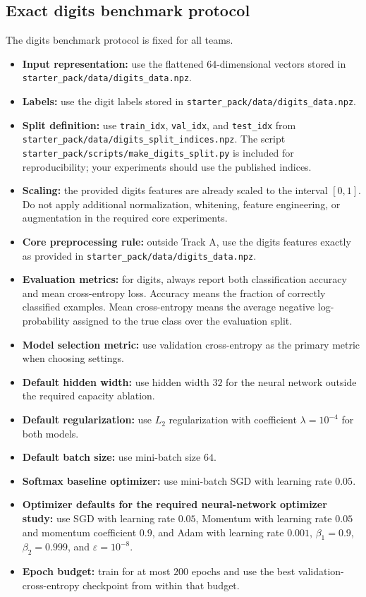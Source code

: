\documentclass[11pt]{article}
\newcommand{\filepath}[1]{\nolinkurl{#1}}
\begin{document}
\subsection{Exact digits benchmark protocol}

The digits benchmark protocol is fixed for all teams.

\begin{itemize}
    \item \textbf{Input representation:} use the flattened 64-dimensional vectors stored in \filepath{starter_pack/data/digits_data.npz}.
    \item \textbf{Labels:} use the digit labels stored in \filepath{starter_pack/data/digits_data.npz}.
    \item \textbf{Split definition:} use \texttt{train\_idx}, \texttt{val\_idx}, and \texttt{test\_idx} from \filepath{starter_pack/data/digits_split_indices.npz}. The script \filepath{starter_pack/scripts/make_digits_split.py} is included for reproducibility; your experiments should use the published indices.
    \item \textbf{Scaling:} the provided digits features are already scaled to the interval \([0,1]\). Do not apply additional normalization, whitening, feature engineering, or augmentation in the required core experiments.
    \item \textbf{Core preprocessing rule:} outside Track A, use the digits features exactly as provided in \filepath{starter_pack/data/digits_data.npz}.
    \item \textbf{Evaluation metrics:} for digits, always report both classification accuracy and mean cross-entropy loss. Accuracy means the fraction of correctly classified examples. Mean cross-entropy means the average negative log-probability assigned to the true class over the evaluation split.
    \item \textbf{Model selection metric:} use validation cross-entropy as the primary metric when choosing settings.
    \item \textbf{Default hidden width:} use hidden width \(32\) for the neural network outside the required capacity ablation.
    \item \textbf{Default regularization:} use \(L_2\) regularization with coefficient \(\lambda = 10^{-4}\) for both models.
    \item \textbf{Default batch size:} use mini-batch size \(64\).
    \item \textbf{Softmax baseline optimizer:} use mini-batch SGD with learning rate \(0.05\).
    \item \textbf{Optimizer defaults for the required neural-network optimizer study:} use SGD with learning rate \(0.05\), Momentum with learning rate \(0.05\) and momentum coefficient \(0.9\), and Adam with learning rate \(0.001\), \(\beta_1=0.9\), \(\beta_2=0.999\), and \(\varepsilon = 10^{-8}\).
    \item \textbf{Epoch budget:} train for at most \(200\) epochs and use the best validation-cross-entropy checkpoint from within that budget.
\end{itemize}
\end{document}
